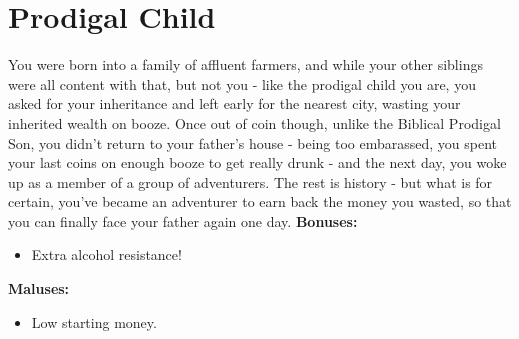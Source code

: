 \section{Prodigal Child}
You were born into a family of affluent farmers, and while your other siblings were all content with that, but not you - like the prodigal child you are, you asked for your inheritance and left early for the nearest city, wasting your inherited wealth on booze. Once out of coin though, unlike the Biblical Prodigal Son, you didn't return to your father's house - being too embarassed, you spent your last coins on enough booze to get really drunk - and the next day, you woke up as a member of a group of adventurers. The rest is history - but what is for certain, you've became an adventurer to earn back the money you wasted, so that you can finally face your father again one day.\newline
\textbf{Bonuses:}
\begin{itemize}
	\item Extra alcohol resistance!
\end{itemize}
\textbf{Maluses:}
\begin{itemize}
	\item Low starting money.
\end{itemize}

